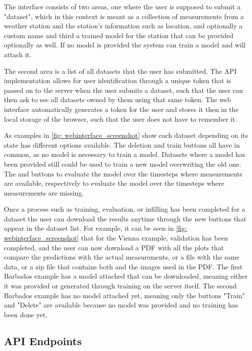 The interface consists of two areas, one where the user is supposed to submit a "dataset", which in this context is meant as a collection of measurements from a weather station and the station's information such as location, and optionally a custom name and third a trained model for the station that can be provided optionally as well.
If no model is provided the system can train a model and will attach it.

The second area is a list of all datasets that the user has submitted.
The API implementation allows for user identification through a unique token that is passed on to the server when the user submits a dataset, such that the user can then ask to see all datasets owned by them using that same token.
The web interface automatically generates a token for the user and stores it then in the local storage of the browser, such that the user does not have to remember it.

As examples in \autoref{fig: webinterface_screenshot} show each dataset depending on its state has different options available.
The deletion and train buttons all have in common, as no model is necessary to train a model.
Datasets where a model has been provided still could be used to train a new model overwriting the old one.
The  and  buttons to evaluate the model over the timesteps where measurements are available, respectively to evaluate the model over the timesteps where measurements are missing.

Once a process such as training, evaluation, or infilling has been completed for a dataset the user can download the results anytime through the new buttons that appear in the dataset list.
For example, it can be seen in \autoref{fig: webinterface_screenshot} that for the Vienna example, validation has been completed, and the user can now download a PDF with all the plots that compare the predictions with the actual measurements, or a  file with the same data, or a zip file that contains both and the images used in the PDF.
The first Barbados example has a model attached that can be downloaded, meaning either it was provided or generated through training on the server itself.
The second Barbados example has no model attached yet, meaning only the buttons "Train" and "Delete" are available because no model was provided and no training has been done yet.

\subsection{API Endpoints}
\label{sec: api}

